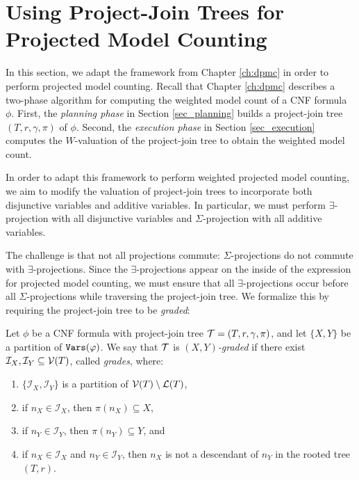 \section{Using Project-Join Trees for Projected Model Counting}
In this section, we adapt the framework from Chapter \ref{ch:dpmc} in order to perform projected model counting. 
Recall that Chapter \ref{ch:dpmc} describes a two-phase algorithm for computing the weighted model count of a CNF formula $\phi$. First, the \emph{planning phase} in Section \ref{sec_planning} builds a project-join tree $(T, r, \gamma, \pi)$ of $\phi$.
Second, the \emph{execution phase} in Section \ref{sec_execution} computes the $W$-valuation of the project-join tree to obtain the weighted model count.

In order to adapt this framework to perform weighted projected model counting, we aim to modify the valuation of project-join trees to incorporate both disjunctive variables and additive variables. In particular, we must perform $\exists$-projection with all disjunctive variables and $\Sigma$-projection with all additive variables.


The challenge is that not all projections commute: $\Sigma$-projections do not commute with $\exists$-projections. Since the $\exists$-projections appear on the inside of the expression for projected model counting, we must ensure that all $\exists$-projections occur before all $\Sigma$-projections while traversing the project-join tree. We formalize this by requiring the project-join tree to be \emph{graded}:
\begin{definition}
\label{def:graded}
    Let $\phi$ be a CNF formula with project-join tree $\mathcal{T} = (T, r, \gamma, \pi)$, and let $\{X, Y\}$ be a partition of $\texttt{\upshape Vars}(\varphi)$.
    We say that $\mathcal{T}$ is \emph{$(X,Y)$-graded} if there exist $\mathcal{I}_X, \mathcal{I}_Y \subseteq \mathcal{V}(T)$, called \emph{grades}, where:
    \begin{enumerate}
        \item $\{\mathcal{I}_X, \mathcal{I}_Y\}$ is a partition of $\mathcal{V}(T) \setminus \mathcal{L}(T)$,
        \item if $n_X \in \mathcal{I}_X$, then $\pi(n_X) \subseteq X$,
        \item if $n_Y \in \mathcal{I}_Y$, then $\pi(n_Y) \subseteq Y$, and
        \item if $n_X \in \mathcal{I}_X$ and $n_Y \in \mathcal{I}_Y$, then $n_X$ is not a descendant of $n_Y$ in the rooted tree $(T, r)$.
    \end{enumerate}
\end{definition}

